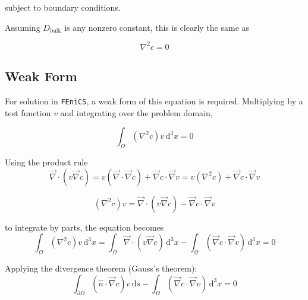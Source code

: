 subject to boundary conditions.

Assuming $D_{\mathrm{bulk}}$ is any nonzero constant, this is clearly the same as

\begin{equation}
  \boxed{
    \nabla^2 c = 0
  }
\end{equation}


\subsection{Weak Form}\label{subsec:unhom_fick_weak}

For solution in \texttt{FEniCS}, a weak form of this equation is required.
Multiplying by a test function $v$ and integrating over the problem domain,

\begin{equation}
  \int_{\Omega} \left(\nabla^2 c \right) v \,\mathrm{d}^3x = 0
\end{equation}

Using the product rule
\begin{equation}
  \vec{\nabla} \cdot \left( v \vec{\nabla} c \right) =
  v \left(\vec{\nabla} \cdot \vec{\nabla} c \right) + \vec{\nabla}c \cdot \vec{\nabla}v =
  v \left(\nabla^2 c \right) + \vec{\nabla}c \cdot \vec{\nabla}v
\end{equation}

\begin{equation}\label{eq:product_rule_divergence}
  \left(\nabla^2 c \right) v =
  \vec{\nabla} \cdot \left( v \vec{\nabla} c \right) - \vec{\nabla}c \cdot \vec{\nabla}v
\end{equation}

to integrate by parts, the equation becomes
\begin{equation}
  \int_{\Omega} \left(\nabla^2 c \right) v \,\mathrm{d}^3x =
  \int_{\Omega} \vec{\nabla} \cdot \left( v \vec{\nabla} c \right) \,\mathrm{d}^3x
  - \int_{\Omega} \left( \vec{\nabla}c \cdot \vec{\nabla}v \right) \,\mathrm{d}^3x =0
\end{equation}

Applying the divergence theorem (Gauss's theorem):
\begin{equation}
  \int_{\partial\Omega} \left( \hat{n} \cdot \vec{\nabla} c \right) v\,\mathrm{d}s
  - \int_{\Omega} \left( \vec{\nabla}c \cdot \vec{\nabla}v \right) \,\mathrm{d}^3x = 0
\end{equation}

